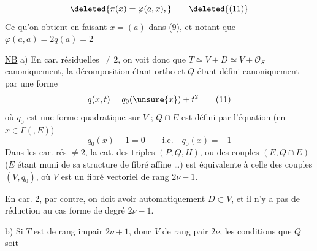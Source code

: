 \[
\deleted{\pi(x)=\varphi(a,x),}\tag*{\deleted{(11)}}
\]
Ce qu'on obtient en faisant $x=(a)$ dans (9), et notant que $\varphi(a,a)=2q(a)=2$


\uline{NB} a) En car. résiduelles $\ne2$, on voit donc que $T\simeq V+D\simeq V+\mathcal O_S$ canoniquement,  la décomposition étant ortho et $Q$ étant défini canoniquement par une forme
\[
q(x,t)=q_0(\unsure{x})+t^2\tag*{(11)}
\]
où $q_0$ est une forme quadratique sur $V$ ; $Q\cap E$ est défini par l'équation (en $x\in\Gamma(,E)$)
\[
q_0(x)+1=0\qquad\text{i.e.}\quad q_0(x)=-1\tag*{(12)}
\]
Dans les car. rés $\ne2$, la cat. des triples $(P,Q,H)$, ou des couples $(E,Q\cap E)$ ($E$ étant muni de sa structure de fibré affine \ldots) est  équivalente à celle des couples $(V,q_0)$, où $V$ est un fibré vectoriel de rang $2\nu-1$.

En car. 2, par contre, on doit avoir automatiquement $D\subset V$, et il n'y a pas\deleted{\unsure{,}} de réduction au cas  forme de degré $2\nu-1$.

b) Si $T$ est de rang impair $2\nu+1$, donc $V$ de rang pair $2\nu$, les conditions que $Q$ soit
